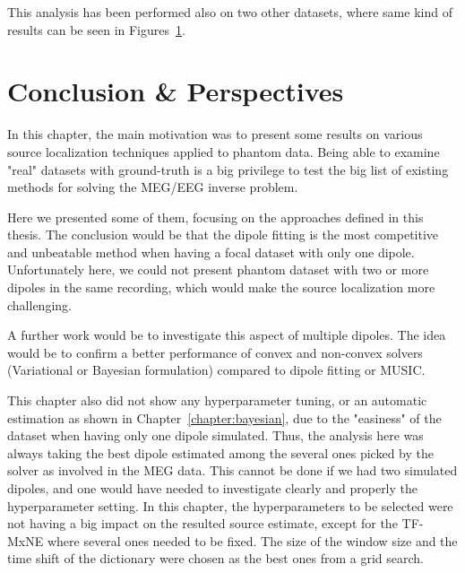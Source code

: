 This analysis has been performed also on two other datasets, where same kind of results can be seen in Figures~\ref{}. 

\section{Conclusion \& Perspectives}
In this chapter, the main motivation was to present some results on various source localization techniques applied to phantom data. Being able to examine "real" datasets with ground-truth is a big privilege to test the big list of existing methods for solving the MEG/EEG inverse problem.

Here we presented some of them, focusing on the approaches defined in this thesis. The conclusion would be that the dipole fitting is the most competitive and unbeatable method when having a focal dataset with only one dipole. Unfortunately here, we could not present phantom dataset with two or more dipoles in the same recording, which would make the source localization more challenging.

A further work would be to investigate this aspect of multiple dipoles. The idea would be to confirm a better performance of convex and non-convex solvers (Variational or Bayesian formulation) compared to dipole fitting or MUSIC.

This chapter also did not show any hyperparameter tuning, or an automatic estimation as shown in Chapter~\ref{chapter:bayesian}, due to the "easiness" of the dataset when having only one dipole simulated. Thus, the analysis here was always taking the best dipole estimated among the several ones picked by the solver as involved in the MEG data. This cannot be done if we had two simulated dipoles, and one would have needed to investigate clearly and properly the hyperparameter setting. In this chapter, the hyperparameters to be selected were not having a big impact on the resulted source estimate, except for the TF-MxNE where several ones needed to be fixed. The size of the window size and the time shift of the dictionary were chosen as the best ones from a grid search.